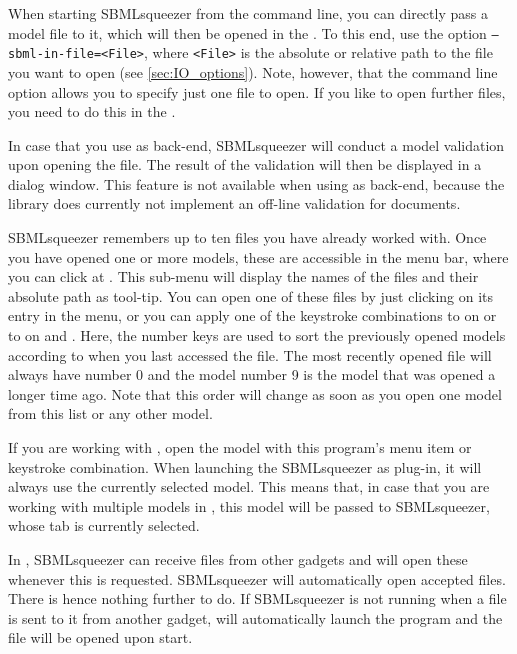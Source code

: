 When starting SBMLsqueezer from the command line, you can directly pass a model
file to it, which will then be opened in the \GUI. To this
end, use the option \texttt{--sbml-in-file=<File>}, where \texttt{<File>} is the
absolute or relative path to the \SBML file you want to open (see
\vref{sec:IO_options}).
Note, however, that the command line option allows you to specify just one file
to open.
If you like to open further files, you need to do this in the \GUI.

In case that you use \libSBML as \SBML back-end, SBMLsqueezer will conduct a model validation upon opening the file.
The result of the validation will then be displayed in a dialog window.
This feature is not available when using \JSBML as \SBML back-end, because the \JSBML library does currently not implement an off-line validation for \SBML documents.

SBMLsqueezer remembers up to ten files you have already worked with.
Once you have opened one or more models, these are accessible in the menu bar,
where you can click at .
This sub-menu will display the names of the files and their absolute path as tool-tip.
You can open one of these files by just clicking on its entry in the menu, or
you can apply one of the keystroke combinations  to 
on \MacOSX or  to  on \Linux and \Windows.
Here, the number keys are used to sort the previously opened models according to
when you last accessed the file.
The most recently opened file will always have number 0 and the model number 9
is the model that was opened a longer time ago.
Note that this order will change as soon as you open one model from this list
or any other model.

If you are working with \CellDesigner, open the model with this program's menu item or keystroke combination.
When launching the SBMLsqueezer as \CellDesigner plug-in, it will always use the currently selected model.
This means that, in case that you are working with multiple models in \CellDesigner, this model will be passed to SBMLsqueezer, whose tab is currently selected.

In \Garuda, SBMLsqueezer can receive files from other gadgets and will open these whenever this is requested.
SBMLsqueezer will automatically open accepted files.
There is hence nothing further to do.
If SBMLsqueezer is not running when a file is sent to it from another gadget, \Garuda will automatically launch the program and the file will be opened upon start.

